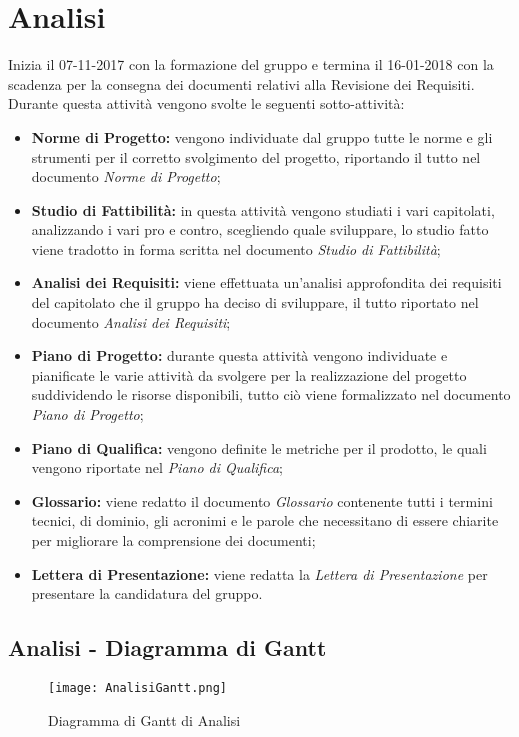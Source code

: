 \documentclass[../PianodiProgetto.tex]{subfiles}
\begin{document}
	\section{Analisi}
	Inizia il 07-11-2017 con la formazione del gruppo e termina il 16-01-2018 con la scadenza per la consegna dei documenti relativi alla Revisione dei Requisiti.
	Durante questa attività vengono svolte le seguenti sotto-attività:
	\begin{itemize}
		\item \textbf{Norme di Progetto:} vengono individuate dal gruppo tutte le norme e gli strumenti per il corretto svolgimento del progetto, riportando il tutto nel documento \textit{Norme di Progetto};
		\item \textbf{Studio di Fattibilità:} in questa attività vengono studiati i vari capitolati, analizzando i vari pro e contro, scegliendo quale sviluppare, lo studio fatto viene tradotto in forma scritta nel documento \textit{Studio di Fattibilità};
		\item \textbf{Analisi dei Requisiti:} viene effettuata un'analisi approfondita dei requisiti del capitolato che il gruppo ha deciso di sviluppare, il tutto riportato nel documento \textit{Analisi dei Requisiti};
		\item \textbf{Piano di Progetto:} durante questa attività vengono individuate e pianificate le varie attività da svolgere per la realizzazione del progetto suddividendo le risorse disponibili, tutto ciò viene formalizzato nel documento \textit{Piano di Progetto}; 
		\item \textbf{Piano di Qualifica:} vengono definite le metriche per il prodotto, le quali vengono riportate nel \textit{Piano di Qualifica};
		\item \textbf{Glossario:} viene redatto il documento \textit{Glossario}	contenente tutti i termini tecnici, di dominio, gli acronimi e le parole che necessitano di essere chiarite per migliorare la comprensione dei documenti;
		\item \textbf{Lettera di Presentazione:} viene redatta la \textit{Lettera di Presentazione} per presentare la candidatura del gruppo.	
	\end{itemize}
	
	\subsection{Analisi - Diagramma di Gantt}
	\begin{figure}[H]
		\texttt{[image: AnalisiGantt.png]}	
		\caption{Diagramma di Gantt di Analisi}\label{fig:1}	
	\end{figure}
	\newpage
\end{document}
